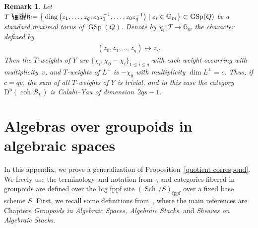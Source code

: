 \documentclass[10pt,a4paper]{amsart}
\makeatletter
\newtheorem{rem}[dfn]{Remark}
\newcommand*{\defeq}{\mathrel{\rlap{%
 \raisebox{0.3ex}{$\m@th\cdot$}}%
 \raisebox{-0.3ex}{$\m@th\cdot$}}%
 =}
\numberwithin{equation}{section}
\newcommand{\coh}{\operatorname{coh}}
\newcommand{\Db}{\operatorname{D^b}}
\newcommand{\diag}{\operatorname{diag}}
\newcommand{\GSp}{\operatorname{GSp}}
\newcommand{\Sch}{\operatorname{Sch\!}}
\newcommand{\fppf}{\operatorname{fppf}}
\newcommand{\cB}{\mathcal{B}}
\newcommand{\bG}{\mathbb{G}}
\makeatother
\begin{document}
\begin{rem}
Let $T\defeq\big\{\diag\big(z_1,\hdots,z_q,z_0z_1^{-1},\hdots,z_0z_q^{-1}\big)\mid z_i\in \bG_m\big\}\subset \GSp(Q)$ be a standard maximal torus of $\GSp(Q)$. Denote by $\chi_i\colon T\to \bG_m$ the character defined by
\begin{gather*}
(z_0,z_1,\hdots,z_q)\mapsto z_i.
\end{gather*}
Then the $T$-weights of $Y$ are $\{\chi_i,\chi_0-\chi_i\}_{1\leq i\leq q}$ with each weight occurring with multiplicity~$v$, and $T$-weights of $L^{\perp}$ is $-\chi_0$ with multiplicity $\dim L^{\perp}=c$. Thus, if $c=qv$, the sum of all $T$-weights of $Y$ is trivial, and in this case the category $\Db(\coh \cB_L)$ is Calabi--Yau of dimen\-sion~$2qs-1$.
\end{rem}
\appendix

\section{Algebras over groupoids in algebraic spaces}\label{appendix}

In this appendix, we prove a generalization of Proposition~\ref{quotient correspond}. We freely use the terminology and notation from~\cite{stacks}, and categories fibered in groupoids are defined over the big fppf site $(\Sch/S)_{\fppf}$ over a fixed base scheme $S$. First, we recall some definitions from~\cite{stacks}, where the main references are Chapters {\it Groupoids in Algebraic Spaces, Algebraic Stacks}, and {\it Sheaves on Algebraic Stacks}.
\end{document}
